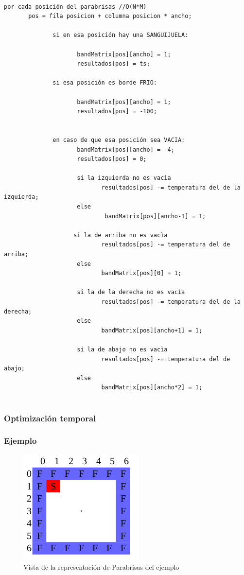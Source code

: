 \begin{verbatim}

por cada posición del parabrisas //O(N*M)
       pos = fila posicion + columna posicion * ancho;
		
              si en esa posición hay una SANGUIJUELA:
			
                     bandMatrix[pos][ancho] = 1;
                     resultados[pos] = ts;
		
              si esa posición es borde FRIO:
                    
                     bandMatrix[pos][ancho] = 1;
                     resultados[pos] = -100;


              en caso de que esa posición sea VACIA:
                     bandMatrix[pos][ancho] = -4;
                     resultados[pos] = 0;
                    
                     si la izquierda no es vacìa
                            resultados[pos] -= temperatura del de la izquierda;
                     else
                             bandMatrix[pos][ancho-1] = 1;

                    si la de arriba no es vacìa
                            resultados[pos] -= temperatura del de arriba;
                     else 
                            bandMatrix[pos][0] = 1;

                     si la de la derecha no es vacìa
                            resultados[pos] -= temperatura del de la derecha;
                     else 
                            bandMatrix[pos][ancho+1] = 1;
                     
                     si la de abajo no es vacìa
                            resultados[pos] -= temperatura del de abajo;
                     else 
                            bandMatrix[pos][ancho*2] = 1;
		

\end{verbatim}
\subsubsection{Optimización temporal}

\subsubsection{Ejemplo}
\begin{figure}[htb]
\begin{center}
\includegraphics[scale=0.70]{imagenes/parabrisasej.png} 
\caption{Vista de la representación de Parabrisas del ejemplo} 
\end{center}
\end{figure}

